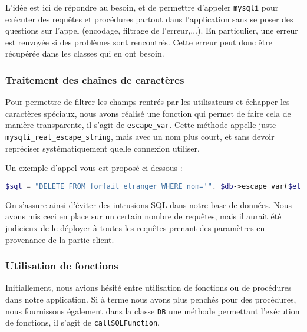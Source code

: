 L'idée est ici de répondre au besoin, et de permettre d'appeler \texttt{mysqli} pour exécuter des requêtes et procédures partout dans l'application sans se poser des questions sur l'appel (encodage, filtrage de l'erreur,...). En particulier, une erreur est renvoyée si des problèmes sont rencontrés. Cette erreur peut donc être récupérée dans les classes qui en ont besoin.

\subsubsection{Traitement des chaînes de caractères}
Pour permettre de filtrer les champs rentrés par les utilisateurs et échapper les caractères spéciaux, nous avons réalisé une fonction qui permet de faire cela de manière transparente, il s'agit de \texttt{escape\_var}. Cette méthode appelle juste \texttt{mysqli\_real\_escape\_string}, mais avec un nom plus court, et sans devoir repréciser systématiquement quelle connexion utiliser.

Un exemple d'appel vous est proposé ci-dessous :
\begin{lstlisting}[language=php]
  $sql = "DELETE FROM forfait_etranger WHERE nom='". $db->escape_var($el) ."';";
\end{lstlisting}

On s'assure ainsi d'éviter des intrusions SQL dans notre base de données. Nous avons mis ceci en place sur un certain nombre de requêtes, mais il aurait été judicieux de le déployer à toutes les requêtes prenant des paramètres en provenance de la partie client.

\subsubsection{Utilisation de fonctions}
Initiallement, nous avions hésité entre utilisation de fonctions ou de procédures dans notre application. Si à terme nous avons plus penchés pour des procédures, nous fournissons également dans la classe \texttt{DB} une méthode permettant l'exécution de fonctions, il s'agit de \texttt{callSQLFunction}.


